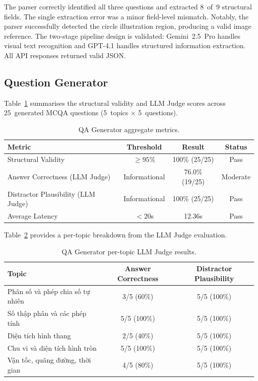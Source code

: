 \documentclass[12pt, a4paper]{article}
\begin{document}
The parser correctly identified all three questions and extracted 8~of~9 structural fields. The single extraction error was a minor field-level mismatch. Notably, the parser successfully detected the circle illustration region, producing a valid image reference. The two-stage pipeline design is validated: Gemini~2.5~Pro handles visual text recognition and GPT-4.1 handles structured information extraction. All API responses returned valid JSON.

\subsection{Question Generator}

Table~\ref{tab:qa-agg} summarises the structural validity and LLM Judge scores across 25~generated MCQA questions (5~topics $\times$ 5~questions).

\begin{table}[H]
\centering
\caption{QA Generator aggregate metrics.}
\label{tab:qa-agg}
\begin{tabular}{l c c c}
\toprule
\textbf{Metric} & \textbf{Threshold} & \textbf{Result} & \textbf{Status} \\
\midrule
Structural Validity               & $\geq 95\%$    & 100\% (25/25)  & Pass \\
Answer Correctness (LLM Judge)    & Informational  & 76.0\% (19/25) & Moderate \\
Distractor Plausibility (LLM Judge) & Informational & 100\% (25/25)  & Pass \\
Average Latency                   & $< 20$s        & 12.36s         & Pass \\
\bottomrule
\end{tabular}
\end{table}

Table~\ref{tab:qa-topic} provides a per-topic breakdown from the LLM Judge evaluation.

\begin{table}[H]
\centering
\caption{QA Generator per-topic LLM Judge results.}
\label{tab:qa-topic}
\small
\begin{tabularx}{\textwidth}{X c c}
\toprule
\textbf{Topic} & \textbf{Answer Correctness} & \textbf{Distractor Plausibility} \\
\midrule
Phân số và phép chia số tự nhiên         & 3/5 (60\%)  & 5/5 (100\%) \\
Số thập phân và các phép tính            & 5/5 (100\%) & 5/5 (100\%) \\
Diện tích hình thang                      & 2/5 (40\%)  & 5/5 (100\%) \\
Chu vi và diện tích hình tròn             & 5/5 (100\%) & 5/5 (100\%) \\
Vận tốc, quãng đường, thời gian          & 4/5 (80\%)  & 5/5 (100\%) \\
\bottomrule
\end{tabularx}
\end{table}
\end{document}

